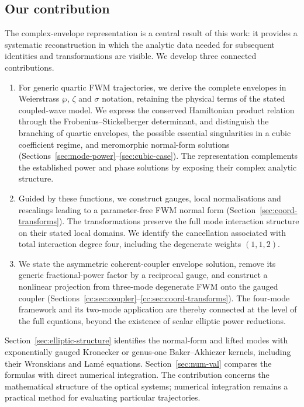 \documentclass[11pt,a4paper]{article}
\numberwithin{equation}{section}
\begin{document}
\subsection{Our contribution}
\label{subsec:our-contribution}
The complex-envelope representation is a central result of this work: it provides a systematic reconstruction in which the analytic data needed for subsequent identities and transformations are visible.
We develop three connected contributions.
\begin{enumerate}
\item For generic quartic FWM trajectories, we derive the complete envelopes in Weierstrass $\wp$, $\zeta$ and $\sigma$ notation, retaining the physical terms of the stated coupled-wave model.
We express the conserved Hamiltonian product relation through the Frobenius--Stickelberger determinant, and distinguish the branching of quartic envelopes, the possible essential singularities in a cubic coefficient regime, and meromorphic normal-form solutions (Sections~\ref{sec:mode-power}--\ref{sec:cubic-case}).
The representation complements the established power and phase solutions by exposing their complex analytic structure.
\item Guided by these functions, we construct gauges, local normalisations and rescalings leading to a parameter-free FWM normal form (Section~\ref{sec:coord-transforms}).
The transformations preserve the full mode interaction structure on their stated local domains.
We identify the cancellation associated with total interaction degree four, including the degenerate weights $(1,1,2)$.
\item We state the asymmetric coherent-coupler envelope solution, remove its generic fractional-power factor by a reciprocal gauge, and construct a nonlinear projection from three-mode degenerate FWM onto the gauged coupler (Sections~\ref{cc:sec:coupler}--\ref{cc:sec:coord-transforms}).
The four-mode framework and its two-mode application are thereby connected at the level of the full equations, beyond the existence of scalar elliptic power reductions.
\end{enumerate}
Section~\ref{sec:elliptic-structure} identifies the normal-form and lifted modes with exponentially gauged Kronecker or genus-one Baker--Akhiezer kernels, including their Wronskians and Lam\'e equations.
Section~\ref{sec:num-val} compares the formulas with direct numerical integration.
The contribution concerns the mathematical structure of the optical systems; numerical integration remains a practical method for evaluating particular trajectories.
\end{document}
